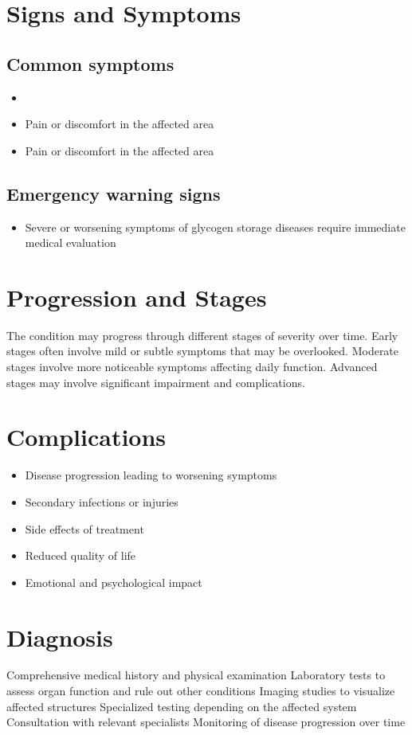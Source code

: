 \section{Signs and Symptoms}

\subsection{Common symptoms}
\begin{itemize}[noitemsep]
  \item \item Pain or discomfort in the affected area    \item Pain or discomfort in the affected area
  \end{itemize}

\subsection{Emergency warning signs}
\begin{itemize}[noitemsep]
  \item Severe or worsening symptoms of glycogen storage diseases require immediate medical evaluation
\end{itemize}
\section{Progression and Stages}
The condition may progress through different stages of severity over time. Early stages often involve mild or subtle symptoms that may be overlooked. Moderate stages involve more noticeable symptoms affecting daily function. Advanced stages may involve significant impairment and complications.
\section{Complications}
\begin{itemize}[noitemsep]
  \item Disease progression leading to worsening symptoms
  \item Secondary infections or injuries
  \item Side effects of treatment
  \item Reduced quality of life
  \item Emotional and psychological impact
\end{itemize}
\section{Diagnosis}
Comprehensive medical history and physical examination Laboratory tests to assess organ function and rule out other conditions Imaging studies to visualize affected structures Specialized testing depending on the affected system Consultation with relevant specialists Monitoring of disease progression over time

